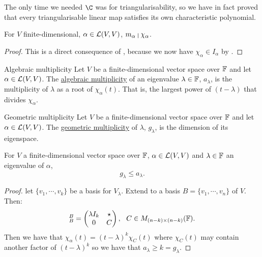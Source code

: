 \documentclass[../Main.tex]{subfiles}
\begin{document}
\begin{remark}
    The only time we needed $\C$ was for triangularisability, so we have in fact proved that every triangularisable linear map satisfies its own characteristic polynomial.
\end{remark}
\begin{corollary}
    For $V$ finite-dimensional, $\alpha \in \mathcal{L}(V, V)$, $m_\alpha~\vline~\chi_\alpha$.
    \label{corMinPolyDividesCharPoly}
\end{corollary}
\begin{proof}
    This is a direct consequence of , because we now have $\chi_\alpha \in I_\alpha$ by .
\end{proof}
\begin{definition}{Algebraic multiplicity}
    Let $V$ be a finite-dimensional vector space over $\mathbb{F}$ and let $\alpha \in \mathcal{L}(V, V)$. The  \underline{algebraic multiplicity} of an eigenvalue $\lambda \in \mathbb{F}$, $a_\lambda$, is the multiplicity of $\lambda$ as a root of $\chi_\alpha(t)$. That is, the largest power of $(t - \lambda)$ that divides $\chi_\alpha$.
\end{definition}
\begin{definition}{Geometric multiplicity}
    Let $V$ be a finite-dimensional vector space over $\mathbb{F}$ and let $\alpha \in \mathcal{L}(V, V)$. The \underline{geometric multiplicity} of $\lambda$, $g_{\lambda}$, is the dimension of its eigenspace.
\end{definition}
\begin{proposition}
    For $V$ a finite-dimensional vector space over $\mathbb{F}$, $\alpha \in \mathcal{L}(V, V)$ and $\lambda \in \mathbb{F}$ an eigenvalue of $\alpha$,
    \begin{equation}
        g_\lambda \leq a_\lambda.
        \label{eqnAMGM}
    \end{equation}
    \label{propAMGM}
\end{proposition}
\begin{proof}
    let $\{v_1, \cdots, v_k\}$ be a basis for $V_\lambda$. Extend to a basis $B = \{v_1, \cdots, v_n\}$ of $V$. Then:
    \begin{equation*}
        [\alpha]_B^B =
        \begin{pmatrix}
            \lambda I_k & \star \\
            0 & C
        \end{pmatrix},~~C \in M_{(n-k) \times (n-k)}(\F).
    \end{equation*}
    Then we have that $\chi_\alpha(t) = (t - \lambda)^k \chi_C(t)$ where $\chi_C(t)$ may contain another factor of $(t - \lambda)^k$ so we have that $a_\lambda \geq k = g_\lambda$.
\end{proof}
\end{document}
